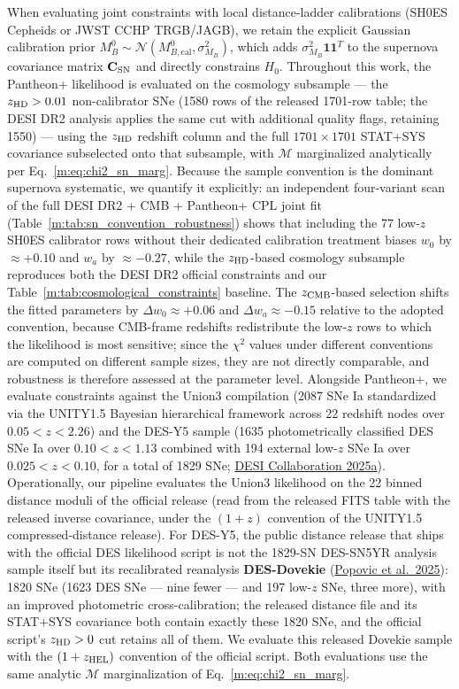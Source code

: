 \documentclass[aps,prd,preprint,superscriptaddress,nofootinbib]{revtex4-2}
\begin{document}
When evaluating joint constraints with local distance-ladder calibrations (SH0ES Cepheids or JWST CCHP TRGB/JAGB), we retain the explicit Gaussian calibration prior $M_B^0 \sim \mathcal{N}(M_{B,\text{cal}}^0, \sigma_{M_B}^2)$, which adds $\sigma_{M_B}^2 \mathbf{1}\mathbf{1}^T$ to the supernova covariance matrix $\mathbf{C}_{\rm SN}$ and directly constrains $H_0$. Throughout this work, the Pantheon+ likelihood is evaluated on the cosmology subsample --- the $z_{\rm HD} > 0.01$ non-calibrator SNe (1580 rows of the released 1701-row table; the DESI DR2 analysis applies the same cut with additional quality flags, retaining 1550) --- using the $z_{\rm HD}$ redshift column and the full $1701 \times 1701$ STAT+SYS covariance subselected onto that subsample, with $\mathcal{M}$ marginalized analytically per Eq.~\ref{m:eq:chi2_sn_marg}. Because the sample convention is the dominant supernova systematic, we quantify it explicitly: an independent four-variant scan of the full DESI DR2 + CMB + Pantheon+ CPL joint fit (Table~\ref{m:tab:sn_convention_robustness}) shows that including the 77 low-$z$ SH0ES calibrator rows without their dedicated calibration treatment biases $w_0$ by $\approx +0.10$ and $w_a$ by $\approx -0.27$, while the $z_{\rm HD}$-based cosmology subsample reproduces both the DESI DR2 official constraints and our Table~\ref{m:tab:cosmological_constraints} baseline. The $z_{\rm CMB}$-based selection shifts the fitted parameters by $\Delta w_0 \approx +0.06$ and $\Delta w_a \approx -0.15$ relative to the adopted convention, because CMB-frame redshifts redistribute the low-$z$ rows to which the likelihood is most sensitive; since the $\chi^2$ values under different conventions are computed on different sample sizes, they are not directly comparable, and robustness is therefore assessed at the parameter level. Alongside Pantheon+, we evaluate constraints against the Union3 compilation (2087 SNe Ia standardized via the UNITY1.5 Bayesian hierarchical framework across 22 redshift nodes over $0.05 < z < 2.26$) and the DES-Y5 sample (1635 photometrically classified DES SNe Ia over $0.10 < z < 1.13$ combined with 194 external low-$z$ SNe Ia over $0.025 < z < 0.10$, for a total of 1829 SNe; \href{https://arxiv.org/abs/2503.14738}{DESI Collaboration 2025a}). Operationally, our pipeline evaluates the Union3 likelihood on the 22 binned distance moduli of the official release (read from the released FITS table with the released inverse covariance, under the $(1+z)$ convention of the UNITY1.5 compressed-distance release). For DES-Y5, the public distance release that ships with the official DES likelihood script is not the 1829-SN DES-SN5YR analysis sample itself but its recalibrated reanalysis \textbf{DES-Dovekie} (\href{https://arxiv.org/abs/2511.07517}{Popovic et al.\ 2025}): 1820 SNe (1623 DES SNe --- nine fewer --- and 197 low-$z$ SNe, three more), with an improved photometric cross-calibration; the released distance file and its STAT+SYS covariance both contain exactly these 1820 SNe, and the official script's $z_{\rm HD} > 0$ cut retains all of them. We evaluate this released Dovekie sample with the $(1+z_{\rm HEL})$ convention of the official script. Both evaluations use the same analytic $\mathcal{M}$ marginalization of Eq.~\ref{m:eq:chi2_sn_marg}.
\end{document}
